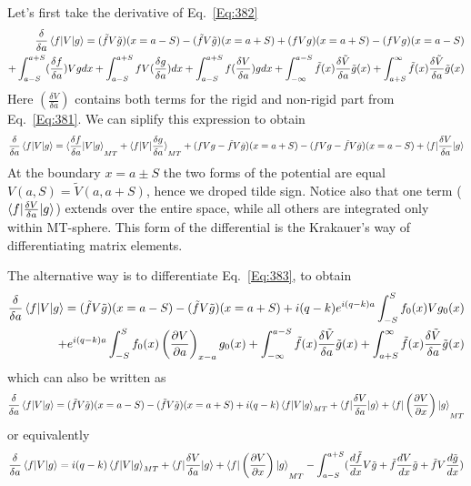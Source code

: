 \documentclass[aps,prb,floatfix,epsfig,singlecolumn,showpacs,preprintnumbers]{revtex4}
\begin{document}
Let's first take the derivative of Eq.~\ref{Eq:382}
\begin{eqnarray}
\frac{\delta}{\delta a}\braket{f|V|g} = (\tilde{f}V\tilde{g})(x=a-S) -  (\tilde{f} V\tilde{g})(x=a+S)
+(f V g)(x=a+S)-(f V g)(x=a-S) \\
+\int_{a-S}^{a+S}  (\frac{\delta f}{\delta a}) V g dx+
\int_{a-S}^{a+S}  f V (\frac{\delta g}{\delta a}) dx+
\int_{a-S}^{a+S} f (\frac{\delta V}{\delta a}) g dx
+\int_{-\infty}^{a-S} \tilde{f}(x) \frac{\delta\tilde{V}}{\delta a} \tilde{g}(x) + \int_{a+S}^{\infty}\tilde{f}(x) \frac{\delta\tilde{V}}{\delta a} \tilde{g}(x) 
\end{eqnarray}
Here $(\frac{\delta V}{\delta a})$ contains both terms for the rigid
and non-rigid part from Eq.~\ref{Eq:381}. We can siplify this
expression to obtain
\begin{eqnarray}
\frac{\delta}{\delta a}\braket{f|V|g} = 
\braket{\frac{\delta f}{\delta a}|V|g}_{MT}+
\braket{f|V|\frac{\delta g}{\delta a}}_{MT}+
(f V g - \tilde{f} V\tilde{g})(x=a+S)
-(f V g - \tilde{f} V\tilde{g})(x=a-S) 
+\braket{f|\frac{\delta V}{\delta a}|g}
\end{eqnarray}
At the boundary $x=a\pm S$ the two forms of the potential are equal
$V(a,S)=\tilde{V}(a,a+S)$, hence we droped tilde sign.
Notice also that one term ($\braket{f|\frac{\delta V}{\delta a}|g}$)
extends over the entire space, while all others are integrated only
within MT-sphere.
This form of the differential is the Krakauer's way of differentiating matrix elements.

The alternative way is to differentiate Eq.~\ref{Eq:383}, to obtain
\begin{eqnarray}
\frac{\delta}{\delta a}\braket{f|V|g} = (\tilde{f} V \tilde{g})(x=a-S) -  (\tilde{f} V\tilde{g})(x=a+S) + 
i(q-k) e^{i (q-k)a} \int_{-S}^{S}  f_0(x) V g_0(x)\\
+e^{i (q-k)a} \int_{-S}^{S}  f_0(x) \left(\frac{\partial V}{\partial a}\right)_{x-a} g_0(x)
+\int_{-\infty}^{a-S} \tilde{f}(x) \frac{\delta\tilde{V}}{\delta a} \tilde{g}(x) + \int_{a+S}^{\infty}\tilde{f}(x) \frac{\delta\tilde{V}}{\delta a} \tilde{g}(x) 
\nonumber
\end{eqnarray}
which can also be written as
\begin{eqnarray}
\frac{\delta}{\delta a}\braket{f|V|g} = (\tilde{f} V \tilde{g})(x=a-S) -  (\tilde{f} V\tilde{g})(x=a+S) + 
i(q-k) \braket{f|V|g}_{MT} 
+\braket{f|\frac{\delta V}{\delta a}|g} 
+\braket{f|\left(\frac{\partial V}{\partial x}\right)|g}_{MT} 
\end{eqnarray}
or equivalently
\begin{eqnarray}
\frac{\delta}{\delta a}\braket{f|V|g} = 
i(q-k) \braket{f|V|g}_{MT}
+\braket{f|\frac{\delta V}{\delta a}|g} 
+\braket{f|\left(\frac{\partial V}{\partial x}\right)|g}_{MT} 
-\int_{a-S}^{a+S} ( \frac{d\tilde{f}}{dx} V \tilde{g} +
  \tilde{f} \frac{d V}{dx} \tilde{g} +\tilde{f} V \frac{d\tilde{g}}{dx}  )
\end{eqnarray}
\end{document}
